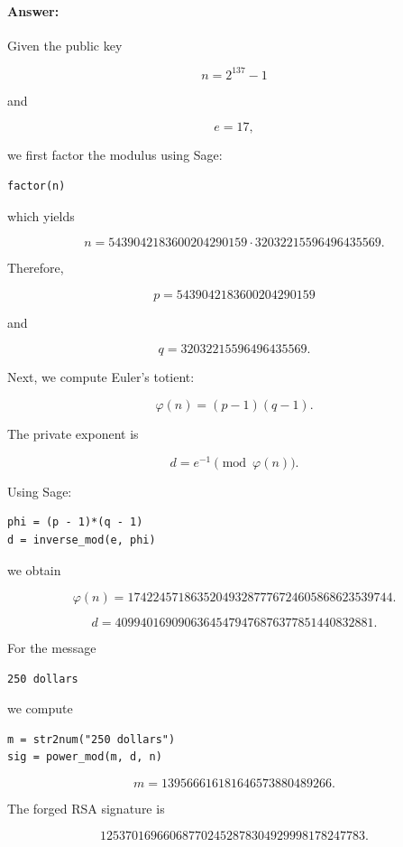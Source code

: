 \documentclass[]{scrartcl}
\begin{document}
\paragraph{Answer:} 

Given the public key

\[
n = 2^{137}-1
\]

and

\[
e = 17,
\]

we first factor the modulus using Sage:

\begin{verbatim}
factor(n)
\end{verbatim}

which yields

\[
n =
5439042183600204290159
\cdot
32032215596496435569.
\]

Therefore,

\[
p = 5439042183600204290159
\]

and

\[
q = 32032215596496435569.
\]

Next, we compute Euler's totient:

\[
\varphi(n)=(p-1)(q-1).
\]

The private exponent is

\[
d=e^{-1}\pmod{\varphi(n)}.
\]

Using Sage:

\begin{verbatim}
phi = (p - 1)*(q - 1)
d = inverse_mod(e, phi)
\end{verbatim}

we obtain

\[
\varphi(n)=174224571863520493287776724605868623539744.
\]

\[
d =
40994016909063645479476876377851440832881.
\]

For the message

\begin{verbatim}
250 dollars
\end{verbatim}

we compute

\begin{verbatim}
m = str2num("250 dollars")
sig = power_mod(m, d, n)
\end{verbatim}

\[
m =
139566616181646573880489266.
\]

The forged RSA signature is

\[
\boxed{
125370169660687702452878304929998178247783
}.
\]
\end{document}
